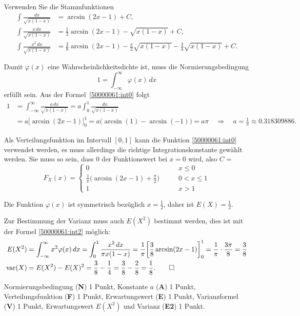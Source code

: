 \begin{hinweis}
Verwenden Sie die Stammfunktionen
\begin{align}
\int\frac{dx}{\sqrt{x(1-x)}}
&=
\arcsin(2x-1) + C,
\label{50000061:int0}
\\
\int\frac{x\,dx}{\sqrt{x(1-x)}}
&=
\frac12\arcsin(2x-1) - \sqrt{x(1-x)} + C,
\label{50000061:int1}
\\
\int\frac{x^2\,dx}{\sqrt{x(1-x)}}
&=
\frac38\arcsin(2x-1) - \frac{x}2\sqrt{x(1-x)} - \frac34\sqrt{x(1-x)} + C.
\label{50000061:int2}
\end{align}
\end{hinweis}

\begin{loesung}
\begin{teilaufgaben}
\item
Damit $\varphi(x)$ eine Wahrscheinlichkeitsdichte ist, muss die
Normierungsbedingung
\[
1
=
\int_{-\infty}^\infty \varphi(x)\,dx
\]
erfüllt sein.
Aus der Formel~\eqref{50000061:int0} folgt
\begin{align*}
1
&=
\int_{-\infty}^\infty \frac{a\,dx}{\sqrt{x(1-x)}}
=
a\int_0^1 \frac{dx}{\!\sqrt{x(1-x)}}
\\
&=
a
\biggl[
\arcsin(2x-1)
\biggr]_0^1
=
a\bigl(\arcsin(1) - \arcsin(-1)\bigr)
=
a\pi
\quad\Rightarrow\quad
a=\frac{1}{\pi}\approx 0.318309886.
\end{align*}
\item
Als Verteilungsfunktion im Intervall $[0,1]$ kann die Funktion
\eqref{50000061:int0} verwendet werden, es muss allerdings die
richtige Integrationskonstante gewählt werden.
Sie muss so sein, dass $0$ der Funktionswert bei $x=0$ wird,
also $C=$
\[
F_X(x)
=
\begin{cases}
0&\qquad x\le 0\\
\frac{1}{\pi}\bigl(\arcsin(2x-1)+\frac{\pi}2\bigr) &\qquad 0<x\le 1\\
1&\qquad x>1
\end{cases}
\]
\item
Die Funktion $\varphi(x)$ ist symmetrisch bezüglich $x=\frac12$, daher ist
$E(X)=\frac12$.
\item
Zur Bestimmung der Varianz muss auch $E(X^2)$ bestimmt werden, dies ist
mit der Formel \eqref{50000061:int2} möglich:
\begin{align*}
E(X^2)
&=
\int_{-\infty}^\infty x^2 \varphi(x)\,dx
=
\int_0^1 \frac{x^2\,dx}{\pi x(1-x)}
=
\frac{1}{\pi}
\biggl[
\frac38 \arcsin(2x-1)
\biggr]_0^1
=
\frac{1}{\pi}\cdot
\frac{3\pi}{8}
=
\frac{3}{8}
\\
\operatorname{var}(X)
&=
E(X^2)-E(X)^2
=
\frac{3}{8} -\frac14
=
\frac38-\frac28
=
\frac18.
\qedhere
\end{align*}
\end{teilaufgaben}
\end{loesung}

\begin{bewertung}
Normierungsbedingung ({\bf N}) 1 Punkt,
Konstante $a$ ({\bf A}) 1 Punkt,
Verteilungsfunktion ({\bf F}) 1 Punkt,
Erwartungswert ({\bf E}) 1 Punkt,
Varianzformel ({\bf V}) 1 Punkt,
Erwartungswert $E(X^2)$ und Varianz ({\bf E2}) 1 Punkt.
\end{bewertung}
